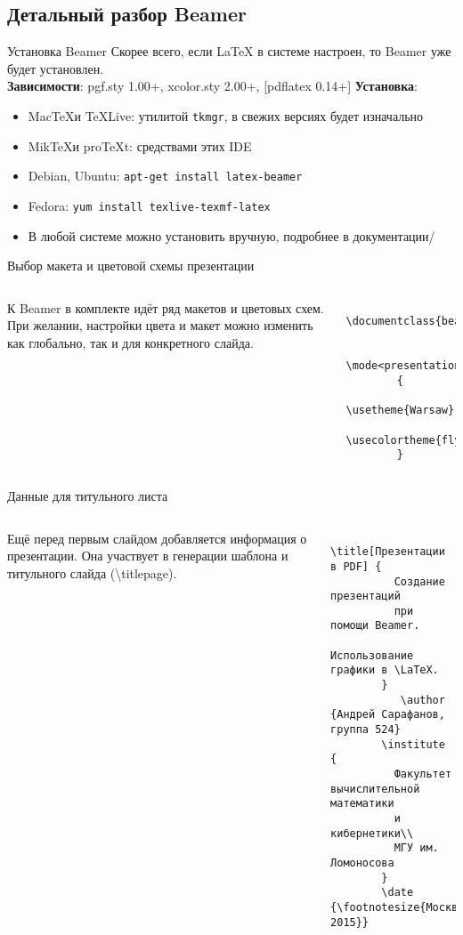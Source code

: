\documentclass{beamer}
\newcommand{\bs}{\textbackslash}
\begin{document}
\subsection{Детальный разбор Beamer}

\begin{frame}{Установка Beamer}
  Скорее всего, если LaTeX в системе настроен, то Beamer уже будет установлен.\\
  \textbf{Зависимости}: pgf.sty 1.00+, xcolor.sty 2.00+, [pdflatex 0.14+]
  \textbf{Установка}: 
    \begin{itemize}
      \item Mac\TeX\space и \TeX\space Live: утилитой \texttt{tkmgr}, в свежих версиях будет изначально
      \item Mik\TeX\space и pro\TeX t: средствами этих IDE
      \item Debian, Ubuntu: \texttt{apt-get install latex-beamer}
      \item Fedora: \texttt{yum install texlive-texmf-latex}
      \item В любой системе можно установить вручную, подробнее в документации/
    \end{itemize}
\end{frame}

\begin{frame}[fragile]{Выбор макета и цветовой схемы презентации}
  \begin{columns}
        К Beamer в комплекте идёт ряд макетов и цветовых схем.\\
        При желании, настройки цвета и макет можно изменить как глобально,
        так и для конкретного слайда.
      \begin{verbatim}
        \documentclass{beamer}

        \mode<presentation>
        {
          \usetheme{Warsaw}
          \usecolortheme{fly}
        }  
      \end{verbatim}
  \end{columns}
\end{frame}

\begin{frame}[fragile]{Данные для титульного листа}
  \begin{columns}
      Ещё перед первым слайдом добавляется информация о презентации. Она участвует в генерации шаблона и титульного слайда (\bs titlepage).
      \begin{verbatim}
        \title[Презентации в PDF] {
          Создание презентаций 
          при помощи Beamer. 
          Использование графики в \LaTeX.
        }
           \author {Андрей Сарафанов, группа 524}
        \institute {
          Факультет вычислительной математики 
          и кибернетики\\
          МГУ им. Ломоносова
        }
        \date {\footnotesize{Москва, 2015}}
      \end{verbatim}
  \end{columns}
\end{frame}
\end{document}
